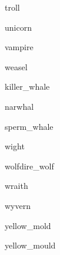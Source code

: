 \documentclass[letterpaper,serif]{module}
\begin{document}
\begin{newmonster}{troll}\end{newmonster}

\begin{newmonster}{unicorn}\end{newmonster}

\begin{newmonster}{vampire}\end{newmonster}

\begin{newmonster}{weasel}\end{newmonster}


\begin{newmonster}{killer_whale}\end{newmonster}

\begin{newmonster}{narwhal}\end{newmonster}

\begin{newmonster}{sperm_whale}\end{newmonster}

\begin{newmonster}{wight}\end{newmonster}


\begin{newmonster2}{wolf}{dire_wolf}
\lipsum[1]
\end{newmonster2}

\begin{newmonster}{wraith}\end{newmonster}

\begin{newmonster}{wyvern}\end{newmonster}

\begin{newmonster}{yellow_mold}\end{newmonster}

\begin{newmonster}{yellow_mould}\end{newmonster}
\end{document}
